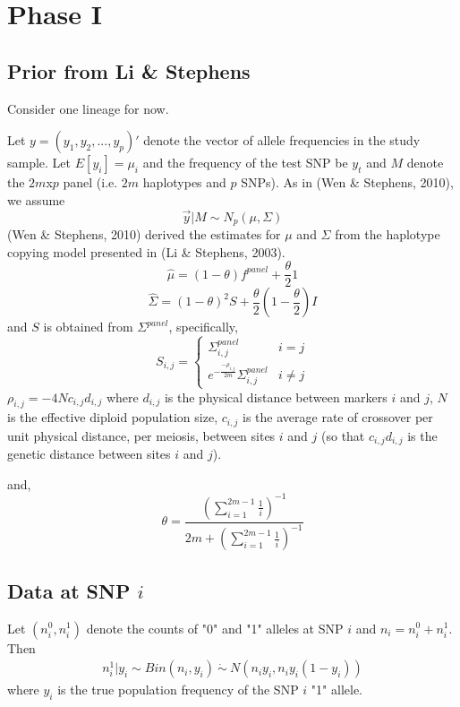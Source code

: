 \documentclass[10pt,a4paper,draft]{article}
\begin{document}
\section{Phase I}
\subsection{Prior from Li \& Stephens}
Consider one lineage for now.

Let  $y = (y_1, y_2, ..., y_p)'$ denote the vector of allele frequencies in the study sample.
Let $E[y_{i}] = \mu_{i}$ and the frequency of the test SNP be $y_{t}$  and $M$ denote the $2m$x$p$ panel (i.e. $2m$ haplotypes and $p$ SNPs). As in (Wen \& Stephens, 2010), we assume 
\begin{equation}
\vec{y} |M \sim N_p(\mu, \Sigma) \label{eq:prior}
\end{equation}
(Wen \& Stephens, 2010) derived the estimates for $\mu$ and $\Sigma$ from the haplotype copying model presented in (Li \& Stephens, 2003).
\begin{equation}
\hat{\mu} = (1-\theta)f^{panel} + \frac{\theta}{2}1 
\end{equation}
\begin{equation}
\hat{\Sigma} = (1-\theta)^2S + \frac{\theta}{2}(1-\frac{\theta}{2})I
\end{equation}
and $S$ is obtained from $\Sigma^{panel}$, specifically,
 \begin{equation}
   S_{i,j} = \left\{
     \begin{array}{lr}
       \Sigma_{i,j}^{panel} &  i =j\\
       e^{-\frac{-\rho_{i,j}}{2m}} \Sigma_{i,j}^{panel} &  i \neq j
     \end{array}
   \right.
\end{equation} 
$\rho_{i,j} = -4Nc_{i,j}d_{i,j}$ where $d_{i,j}$ is the physical distance between markers $i$ and $j$, $N$ is the effective diploid population size, $c_{i,j}$ is the average rate of crossover per unit physical distance, per meiosis, between sites $i$ and $j$ (so that $c_{i,j}d_{i,j}$ is the genetic distance between sites $i$ and $j$). 

and,
\begin{equation}
\theta = \frac{(\sum_{i=1}^{2m-1} \frac{1}{i})^{-1}}{2m + (\sum_{i=1}^{2m-1} \frac{1}{i})^{-1}}
\end{equation}

\subsection{Data at SNP $i$}
Let $(n_i^0, n_i^1)$ denote the counts of "0" and "1" alleles at SNP $i$ and $n_i = n_i^0 + n_i^1$. Then 
\begin{align*}
n_i^1 | y_i \sim Bin(n_i, y_i) \ \dot{\sim}  \ N(n_iy_i, n_iy_i(1-y_i)) \label{eq:napprox}
\end{align*}
where $y_i$ is the true population frequency of the SNP $i$ "1" allele. 
\end{document}
